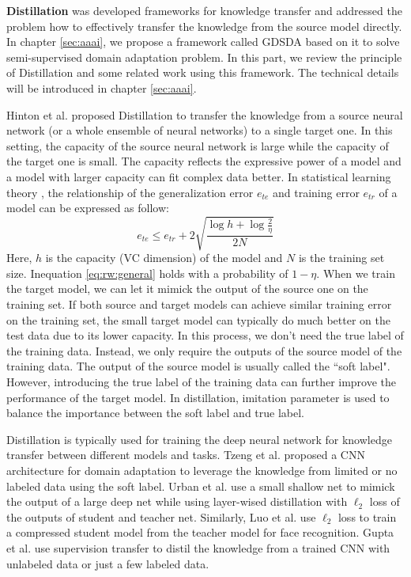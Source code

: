 \textbf{Distillation} \cite{hinton2015distilling} was developed frameworks for knowledge transfer and addressed the problem how to effectively transfer the knowledge from the source model directly. In chapter \ref{sec:aaai}, we propose a framework called GDSDA based on it to solve semi-supervised domain adaptation problem. In this part, we review the principle of Distillation and some related work using this framework. The technical details will be introduced in chapter \ref{sec:aaai}.

Hinton et al. proposed Distillation to transfer the knowledge from a source neural network (or a whole ensemble of neural networks) to a single target one. In this setting, the capacity of the source neural network is large while the capacity of the target one is small. The capacity reflects the expressive power of a model and a model with larger capacity can fit complex data better. In statistical learning theory \cite{vapnik1999overview}, the relationship of the generalization error $e_{te}$ and training error $e_{tr}$ of a model can be expressed as follow:
\begin{equation}\label{eq:rw:general}
e_{te}\leq e_{tr}+2\sqrt{\frac{\log h +\log\frac{2}{\eta}}{2N}}
\end{equation}
Here, $h$ is the capacity (VC dimension) of the model and $N$ is the training set size. Inequation \ref{eq:rw:general} holds with a probability of $1-\eta$.
When we train the target model, we can let it mimick the output of the source one on the training set. If both source and target models can achieve similar training error on the training set, the small target model can typically do much better on the test data due to its lower capacity. In this process, we don't need the true label of the training data. Instead, we only require the outputs of the source model of the training data. The output of the source model is usually called the ``soft label". However, introducing the true label of the training data can further improve the performance of the target model. In distillation, imitation parameter is used to balance the importance between the soft label and true label.

Distillation is typically used for training the deep neural network for knowledge transfer between different models and tasks. Tzeng et al. \cite{Tzeng_2015_ICCV} proposed a CNN architecture for domain adaptation to leverage the knowledge from limited or no labeled data using the soft label. Urban et al. \cite{urban2016deep} use a small shallow net to mimick the output of a large deep net while using layer-wised distillation with $\ell_2$ loss of the outputs of student and teacher net. Similarly, Luo et al. \cite{luo2016face} use $\ell_2$ loss to train a compressed student model from the teacher model for face recognition. Gupta et al. \cite{Gupta_2016_CVPR} use supervision transfer to distil the knowledge from a trained CNN with unlabeled data or just a few labeled data.

